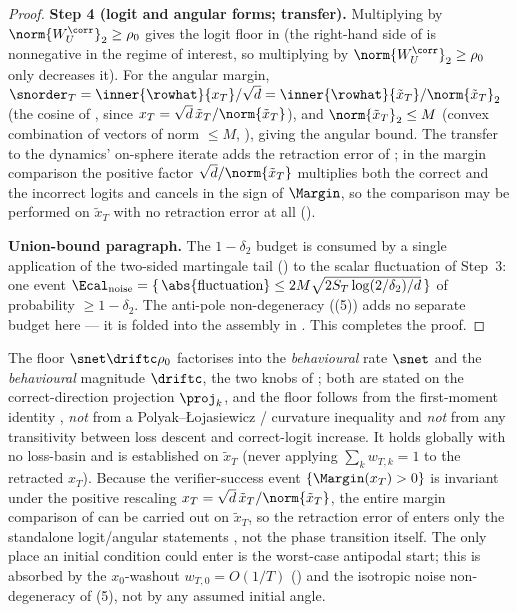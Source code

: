 \begin{proof}
\smallskip\noindent\textbf{Step 4 (logit and angular forms; transfer).}
Multiplying  by
$\norm{W_U^{\corr}}_2\ge\rho_0$ gives the logit floor in
 (the right-hand side of
 is nonnegative in the regime of interest, so
multiplying by $\norm{W_U^{\corr}}_2\ge\rho_0$ only decreases it). For the
angular margin, $\snorder_T=\inner{\rowhat}{x_T}/\sqrt d=\inner{\rowhat}{\tilde x_T}/\norm{\tilde x_T}_2$
(the cosine of , since
$x_T=\sqrt d\,\tilde x_T/\norm{\tilde x_T}$), and $\norm{\tilde x_T}_2\le M$
(convex combination of vectors of norm $\le M$,
), giving the angular bound. The transfer to the
dynamics' on-sphere iterate adds the retraction error of
; in the  margin comparison the
positive factor $\sqrt d/\norm{\tilde x_T}$ multiplies both the correct and
the incorrect logits and cancels in the sign of $\Margin$, so the
comparison may be performed on $\tilde x_T$ with no retraction error at all
().

\smallskip\noindent\textbf{Union-bound paragraph.} The $1-\delta_2$ budget
is consumed by a single application of the two-sided martingale tail
() to the scalar fluctuation of Step~3: one event
$\Ecal_{\mathrm{noise}}=\{\,\abs{\text{fluctuation}}\le2M\sqrt{2S_T\log(2/\delta_2)/d}\,\}$
of probability $\ge1-\delta_2$. The anti-pole non-degeneracy
((5)) adds no separate budget here --- it is
folded into the assembly in . This completes the proof.
\end{proof}

\begin{remark}
\label{rem:signal_floor_provenance}
The floor $\snet\driftc\rho_0$ factorises into the \emph{behavioural} rate
$\snet$ and the \emph{behavioural} magnitude $\driftc$, the two knobs of
; both are stated on the correct-direction projection
$\proj_k$, and the floor follows from the first-moment identity
, \emph{not} from a Polyak--\L{}ojasiewicz / curvature
inequality and \emph{not} from any transitivity between loss descent and
correct-logit increase. It holds globally with no loss-basin and is
established on $\tilde x_T$ (never applying $\sum_k w_{T,k}=1$ to the
retracted $x_T$). Because the verifier-success event $\{\Margin(x_T)>0\}$
is invariant under the positive rescaling $x_T=\sqrt d\,\tilde x_T/\norm{\tilde x_T}$,
the entire margin comparison of  can be carried out on
$\tilde x_T$, so the retraction error of 
enters only the standalone logit/angular statements
, not the phase transition itself. The only
place an initial condition could enter is the worst-case antipodal start;
this is absorbed by the $x_0$-washout $w_{T,0}=O(1/T)$
() and the isotropic noise non-degeneracy of
(5), not by any assumed initial angle.
\end{remark}
